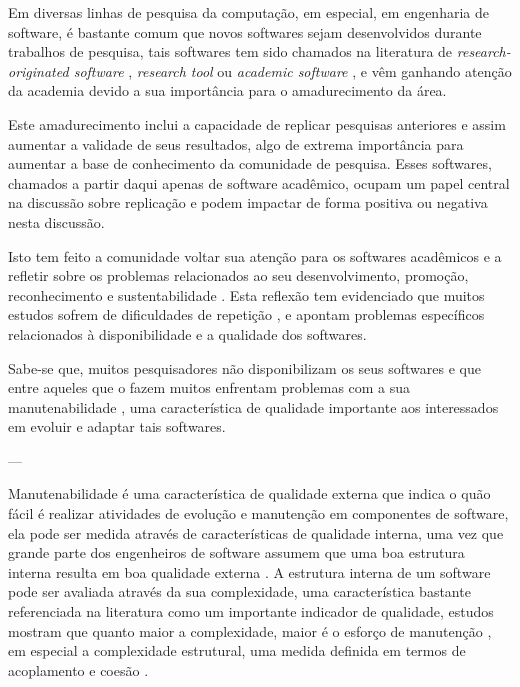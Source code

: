 
Em diversas linhas de pesquisa da computação, em especial, em engenharia de
software, é bastante comum que novos softwares sejam desenvolvidos durante
trabalhos de pesquisa, tais softwares tem sido chamados na literatura de {\it
research-originated software} \cite{Kon2011}, {\it research tool}
\cite{Portillo12} ou {\it academic software} \cite{allen2017engineering}, e vêm
ganhando atenção da academia devido a sua importância para o amadurecimento da
área.

Este amadurecimento inclui a capacidade de replicar pesquisas anteriores e
assim aumentar a validade de seus resultados, algo de extrema importância para
aumentar a base de conhecimento da comunidade de pesquisa. Esses softwares,
chamados a partir daqui apenas de software acadêmico, ocupam um papel central
na discussão sobre replicação \cite{Stodden2009, Peng2011} e podem impactar de
forma positiva ou negativa nesta discussão.

Isto tem feito a comunidade voltar sua atenção para os softwares acadêmicos e a
refletir sobre os problemas relacionados ao seu desenvolvimento, promoção,
reconhecimento e sustentabilidade \cite{allen2017engineering}. Esta reflexão
tem evidenciado que muitos estudos sofrem de dificuldades de repetição
\cite{Tang2016}, e apontam problemas específicos relacionados à disponibilidade
e a qualidade dos softwares.

Sabe-se que, muitos pesquisadores não disponibilizam os seus softwares
\cite{robles2010replicating, amann2015software} e que entre aqueles que o fazem
muitos enfrentam problemas com a sua manutenabilidade \cite{Prlic2012}, uma
característica de qualidade importante aos interessados em evoluir e adaptar
tais softwares.


---



Manutenabilidade é uma característica de qualidade externa que indica o quão
fácil é realizar atividades de evolução e manutenção em componentes de
software, ela pode ser medida através de características de qualidade interna,
uma vez que grande parte dos engenheiros de software assumem que uma boa
estrutura interna resulta em boa qualidade externa \cite{Fenton2014}. A
estrutura interna de um software pode ser avaliada através da sua complexidade,
uma característica bastante referenciada na literatura como um importante
indicador de qualidade, estudos mostram que quanto maior a complexidade, maior
é o esforço de manutenção \cite{hashim1996software, Darcy2005}, em especial a
complexidade estrutural, uma medida definida em termos de acoplamento e coesão
\cite{Terceiro2012}.

